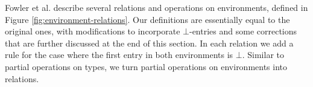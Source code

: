 %
%
%

Fowler et al. \cite{fowlerSpecialDeliveryProgramming2023} describe several relations and operations on environments, defined in Figure \ref{fig:environment-relations}.
Our definitions are essentially equal to the original ones, with modifications to incorporate $\bot$-entries and some corrections that are further discussed at the end of this section.
In each relation we add a rule for the case where the first entry in both environments is $\bot$.
Similar to partial operations on types, we turn partial operations on environments into relations.

%

